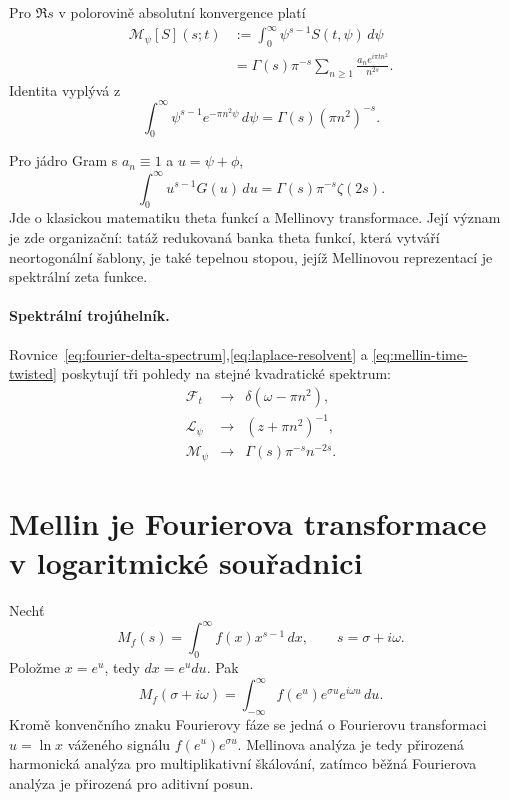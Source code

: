 Pro $\Re s$ v polorovině absolutní konvergence platí
\begin{align}
  \mathcal M_\psi[S](s;t)
  &:=\int_0^\infty \psi^{s-1}S(t,\psi)\,d\psi \\
  &=\Gamma(s)\pi^{-s}
    \sum_{n\ge1}\frac{a_n e^{i\pi t n^2}}{n^{2s}}.
  \label{eq:mellin-time-twisted}
\end{align}
Identita vyplývá z
\begin{equation}
 \int_0^\infty \psi^{s-1}e^{-\pi n^2\psi}\,d\psi
 =\Gamma(s)(\pi n^2)^{-s}.
\end{equation}

Pro jádro Gram s $a_n\equiv1$ a $u=\psi+\phi$,
\begin{equation}
 \int_0^\infty u^{s-1}G(u)\,du
 =\Gamma(s)\pi^{-s}\zeta(2s).
 \label{eq:gram-mellin-zeta}
\end{equation}
Jde o klasickou matematiku theta funkcí a Mellinovy transformace. Její význam
je zde organizační: tatáž redukovaná banka theta funkcí, která vytváří
neortogonální šablony, je také tepelnou stopou, jejíž Mellinovou reprezentací je
spektrální zeta funkce.

\paragraph{Spektrální trojúhelník.}
Rovnice~\eqref{eq:fourier-delta-spectrum},\eqref{eq:laplace-resolvent} a
\eqref{eq:mellin-time-twisted} poskytují tři pohledy na stejné kvadratické spektrum:
\begin{equation}
 \boxed{
 \begin{array}{ccl}
   \mathcal F_t   &\longrightarrow& \delta(\omega-\pi n^2),\\[2mm]
   \mathcal L_\psi&\longrightarrow& (z+\pi n^2)^{-1},\\[2mm]
   \mathcal M_\psi&\longrightarrow& \Gamma(s)\pi^{-s}n^{-2s}.
 \end{array}}
 \label{eq:spectral-triangle}
\end{equation}

\section{Mellin je Fourierova transformace v logaritmické souřadnici}

Nechť
\begin{equation}
  M_f(s)=\int_0^\infty f(x)x^{s-1}\,dx,
  \qquad s=\sigma+i\omega.
\end{equation}
Položme $x=e^u$, tedy $dx=e^u du$. Pak
\begin{equation}
  M_f(\sigma+i\omega)
  =\int_{-\infty}^{\infty}
   f(e^u)e^{\sigma u}e^{i\omega u}\,du.
  \label{eq:mellin-log-fourier}
\end{equation}
Kromě konvenčního znaku Fourierovy fáze se jedná o Fourierovu transformaci
$u=\ln x$ váženého signálu $f(e^u)e^{\sigma u}$.  Mellinova analýza je tedy
přirozená harmonická analýza pro multiplikativní škálování, zatímco běžná Fourierova analýza
je přirozená pro aditivní posun.

